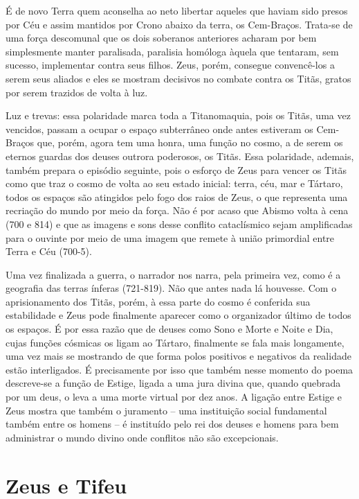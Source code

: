 É de novo Terra quem aconselha ao neto libertar aqueles que haviam sido
presos por Céu e assim mantidos por Crono abaixo da terra, os
Cem-Braços. Trata-se de uma força descomunal que os dois soberanos
anteriores acharam por bem simplesmente manter paralisada, paralisia
homóloga àquela que tentaram, sem sucesso, implementar contra seus
filhos. Zeus, porém, consegue convencê-los a serem seus aliados e eles
se mostram decisivos no combate contra os Titãs, gratos por serem
trazidos de volta à luz.

Luz e trevas: essa polaridade marca toda a Titanomaquia, pois os Titãs,
uma vez vencidos, passam a ocupar o espaço subterrâneo onde antes
estiveram os Cem-Braços que, porém, agora tem uma honra, uma função no
cosmo, a de serem os eternos guardas dos deuses outrora poderosos, os
Titãs. Essa polaridade, ademais, também prepara o episódio seguinte,
pois o esforço de Zeus para vencer os Titãs como que traz o cosmo de
volta ao seu estado inicial: terra, céu, mar e Tártaro, todos os espaços
são atingidos pelo fogo dos raios de Zeus, o que representa uma
recriação do mundo por meio da força. Não é por acaso que Abismo volta à
cena (700 e 814) e que as imagens e sons desse conflito cataclísmico
sejam amplificadas para o ouvinte por meio de uma imagem que remete à
união primordial entre Terra e Céu (700-5).

Uma vez finalizada a guerra, o narrador nos narra, pela primeira vez,
como é a geografia das terras ínferas (721-819). Não que antes nada lá
houvesse. Com o aprisionamento dos Titãs, porém, à essa parte do cosmo é
conferida sua estabilidade e Zeus pode finalmente aparecer como o
organizador último de todos os espaços. É por essa razão que de deuses
como Sono e Morte e Noite e Dia, cujas funções cósmicas os ligam ao
Tártaro, finalmente se fala mais longamente, uma vez mais se mostrando
de que forma polos positivos e negativos da realidade estão
interligados. É precisamente por isso que também nesse momento do poema
descreve-se a função de Estige, ligada a uma jura divina que, quando
quebrada por um deus, o leva a uma morte virtual por dez anos. A ligação
entre Estige e Zeus mostra que também o juramento -- uma instituição
social fundamental também entre os homens -- é instituído pelo rei dos
deuses e homens para bem administrar o mundo divino onde conflitos não
são excepcionais.

\section{Zeus e Tifeu}

